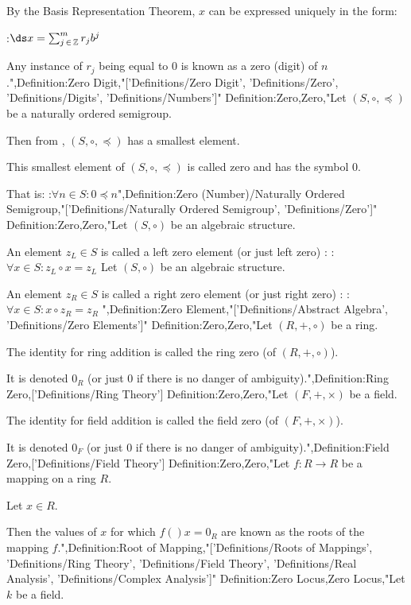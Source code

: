 By the Basis Representation Theorem, $x$ can be expressed uniquely in the form:

:$\ds x = \sum_{j \mathop \in \mathbb Z}^m r_j b^j$


Any instance of $r_j$ being equal to $0$ is known as a zero (digit) of $n$.",Definition:Zero Digit,"['Definitions/Zero Digit', 'Definitions/Zero', 'Definitions/Digits', 'Definitions/Numbers']"
Definition:Zero,Zero,"Let $\left( S, \circ, \preceq \right)$ be a naturally ordered semigroup.

Then from , $\left( S, \circ, \preceq \right)$ has a smallest element.


This smallest element of $\left( S, \circ, \preceq \right)$ is called zero and has the symbol $0$.

That is:
:$\forall n \in S: 0 \preceq n$",Definition:Zero (Number)/Naturally Ordered Semigroup,"['Definitions/Naturally Ordered Semigroup', 'Definitions/Zero']"
Definition:Zero,Zero,"Let $\left( S, \circ \right)$ be an algebraic structure.

An element $z_L \in S$ is called a left zero element (or just left zero) :
:$\forall x \in S: z_L \circ x = z_L$
Let $\left( S, \circ \right)$ be an algebraic structure.

An element $z_R \in S$ is called a right zero element (or just right zero) :
:$\forall x \in S: x \circ z_R = z_R$
",Definition:Zero Element,"['Definitions/Abstract Algebra', 'Definitions/Zero Elements']"
Definition:Zero,Zero,"Let $\left( R, +, \circ \right)$ be a ring.

The identity for ring addition is called the ring zero (of $\left( R, +, \circ \right)$).


It is denoted $0_R$ (or just $0$ if there is no danger of ambiguity).",Definition:Ring Zero,['Definitions/Ring Theory']
Definition:Zero,Zero,"Let $\left( F, +, \times \right)$ be a field.

The identity for field addition is called the field zero (of $\left( F, +, \times \right)$).


It is denoted $0_F$ (or just $0$ if there is no danger of ambiguity).",Definition:Field Zero,['Definitions/Field Theory']
Definition:Zero,Zero,"Let $f: R \to R$ be a mapping on a ring $R$.

Let $x \in R$.


Then the values of $x$ for which $f \left(   \right)x = 0_R$ are known as the roots of the mapping $f$.",Definition:Root of Mapping,"['Definitions/Roots of Mappings', 'Definitions/Ring Theory', 'Definitions/Field Theory', 'Definitions/Real Analysis', 'Definitions/Complex Analysis']"
Definition:Zero Locus,Zero Locus,"Let $k$ be a field.

